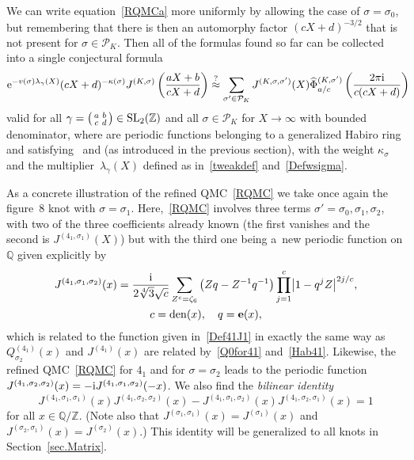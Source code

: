\documentclass[pdftex]{sigma}
\numberwithin{equation}{section}
\def\BQ{\mathbb Q}
\def\calP{\mathcal P}
\def\calP{\mathcal P}
\def\l{\lambda}
\def\k{\kappa}
\def\SL{\mathrm{SL}}
\def\z{\zeta}
\def\Phih{\widehat\Phi}
\def\e{\mathbf{e}}
\def\l{\lambda}
\def\Z{\mathbb Z}
\def\Q{\mathbb Q}
\def\m{ - }
\def\e{\mathbf{e}}
\def\l{\lambda}
\def\z{\zeta}
\def\s{\sigma}
\def\sma#1#2#3#4{\bigl(\smallmatrix#1&#2\\#3&#4\endsmallmatrix\bigr)} %
\def\den{\mathrm{den}}
\def\J{\mathbf J} \def\J{J} %
\def\tV{v} %
\def\be{\begin{equation}}
\def\ee{\end{equation}}
\def\g{\gamma}
\def\bQ{Q}
\def\bJ{J} \def\bJ{\mathbf{J}}
\begin{document}
We can write equation~\eqref{RQMCa} more uniformly by allowing the
case of $\s=\s_0$, but remembering that there is then an automorphy factor
$(cX+d)^{-3/2}$ that is not present for $\s\in\calP_K$. Then all of the formulas
found so far can be collected into a single conjectural formula
\begin{gather}
\label{RQMC}
{\rm e}^{-\tV(\s)\l_\g(X)} (cX+d)^{-\k(\s)}
\J^{(K,\s)}\left(\frac{aX+b}{cX+d}\right)
 \overset?\approx
\sum_{\s'\in\calP_K}
\J^{(K,\s,\s')}(X)
\Phih^{(K,\s')}_{a/c}\left(\frac{2\pi {\rm i}}{c(cX+d)}\right)\!\!\!
\end{gather}
valid for all $\g=\sma abcd\in\SL_2(\Z)$ and all $\s\in\calP_K$ for $X\to\infty$
with bounded denominator, where \smash{$\J^{(K,\s,\s')}$} are periodic functions belonging
to a generalized Habiro ring and satisfying~\smash{$\J^{(K,\s,\s_0)}=\delta_{\s,\s_0}$} and
\smash{$\J^{(K,\s_0,\s)}=Q^{(K)}_\s$} (as introduced in the previous section), with the weight
$\k_\s$ and the multiplier~$\l_\g(X)$ defined as in~\eqref{tweakdef}
and~\eqref{Defwsigma}.

As a concrete illustration of the refined QMC~\eqref{RQMC} we take once again the
figure~8 knot with $\s=\s_1$. Here,~\eqref{RQMC} involves three terms
$\s'=\s_0,\s_1,\s_2$, with two of the three coefficients already known
(the first vanishes and the second is $\J^{(4_1,\s_1)}(X)$) but with the third one being
a~new periodic function on $\BQ$ given explicitly by
\begin{gather}
\J^{(4_1,\s_1,\s_2)}(x)
= \frac {\rm i}{2\sqrt[4]{3}\sqrt{c}}
\sum_{Z^c = \z_6} \big(Z q -Z^{-1} q^{-1}
\big) \prod_{j=1}^c \bigl|1\m q^jZ\bigr|^{2j/c},\nonumber
\\
c=\den(x),\quad q=\e(x) ,\label{Q1for41}
\end{gather}
which is related to the function given in~\eqref{Def41J1} in exactly
the same way as $Q^{(4_1)}_{\s_2}(x)$ and $\J^{(4_1)}(x)$ are related
by~\eqref{Q0for41} and~\eqref{Hab41}. Likewise, the refined QMC~\eqref{RQMC}
for $4_1$ and for $\s=\s_2$ leads to the periodic function
$\J^{(4_1,\s_2,\s_2)}(x) =-{\rm i} \J^{(4_1,\s_1,\s_2)}(-x)$. We also find
the \emph{bilinear identity}
\be
\label{FirstBilin}
\J^{(4_1,\s_1,\s_1)}(x)  \J^{(4_1,\s_2,\s_2)}(x) \m
\J^{(4_1,\s_1,\s_2)}(x)  \J^{(4_1,\s_2,\s_1)}(x)  = 1
\ee
for all $x\in\Q/\Z$. \big(Note also that $\J^{(\s_1,\s_1)}(x)=\J^{(\s_1)}(x)$
and $\J^{(\s_2,\s_1)}(x)=\J^{(\s_2)}(x)$.\big)
This identity will be generalized to all knots in Section~\ref{sec.Matrix}.
\end{document}
